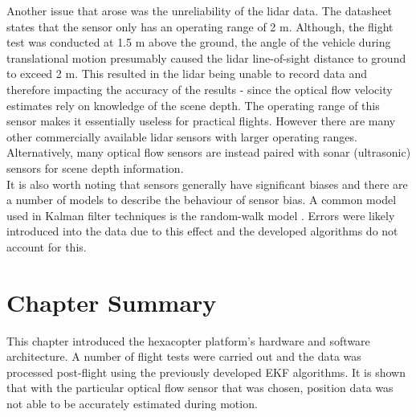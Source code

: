 Another issue that arose was the unreliability of the lidar data. The datasheet states that the sensor only has an operating range of 2 m. Although, the flight test was conducted at 1.5 m above the ground, the angle of the vehicle during translational motion presumably caused the lidar line-of-sight distance to ground to exceed 2 m. This resulted in the lidar being unable to record data and therefore impacting the accuracy of the results - since the optical flow velocity estimates rely on knowledge of the scene depth. The operating range of this sensor makes it essentially useless for practical flights. However there are many other commercially available lidar sensors with larger operating ranges. Alternatively, many optical flow sensors are instead paired with sonar (ultrasonic) sensors for scene depth information.\\

It is also worth noting that sensors generally have significant biases and there are a number of models to describe the behaviour of sensor bias. A common model used in Kalman filter techniques is the random-walk model \cite{Sabatini2011}. Errors were likely introduced into the data due to this effect and the developed algorithms do not account for this.



\section{Chapter Summary}
This chapter introduced the hexacopter platform's hardware and software architecture. A number of flight tests were carried out and the data was processed post-flight using the previously developed EKF algorithms. It is shown that with the particular optical flow sensor that was chosen, position data was not able to be accurately estimated during motion.

\clearpage


